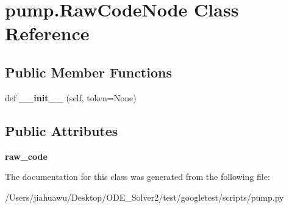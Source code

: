 \hypertarget{classpump_1_1_raw_code_node}{}\section{pump.\+Raw\+Code\+Node Class Reference}
\label{classpump_1_1_raw_code_node}
\subsection*{Public Member Functions}
\begin{DoxyCompactItemize}
\item 
\mbox{\label{classpump_1_1_raw_code_node_a7ba81f4da42d4e96a89713032867f87f}} 
def {\bfseries \+\_\+\+\_\+init\+\_\+\+\_\+} (self, token=None)
\end{DoxyCompactItemize}
\subsection*{Public Attributes}
\begin{DoxyCompactItemize}
\item 
\mbox{\label{classpump_1_1_raw_code_node_ab36224d959e0d8f803e9fac8e6a0baab}} 
{\bfseries raw\+\_\+code}
\end{DoxyCompactItemize}


The documentation for this class was generated from the following file\+:\begin{DoxyCompactItemize}
\item 
/\+Users/jiahuawu/\+Desktop/\+O\+D\+E\+\_\+\+Solver2/test/googletest/scripts/pump.\+py\end{DoxyCompactItemize}
